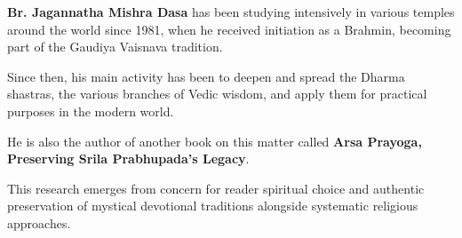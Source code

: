 \documentclass[11pt,twoside]{book}
\begin{document}
\textbf{\textbf{Br. Jagannatha Mishra Dasa}} has been studying intensively in various temples around the world since 1981, when he received initiation as a Brahmin, becoming part of the Gaudiya Vaisnava tradition.

Since then, his main activity has been to deepen and spread the Dharma shastras, the various branches of Vedic wisdom, and apply them for practical purposes in the modern world. 

He is also the author of another book on this matter called \textbf{Arsa Prayoga, Preserving Srila Prabhupada's Legacy}.

This research emerges from concern for reader spiritual choice and authentic preservation of mystical devotional traditions alongside systematic religious approaches.
\end{document}
